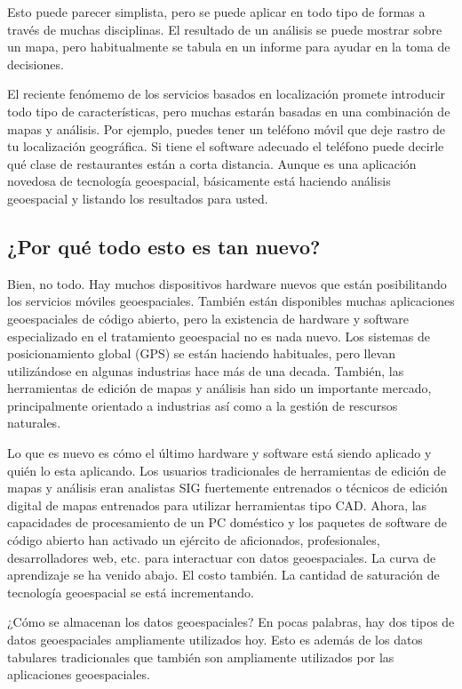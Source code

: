 Esto puede parecer simplista, pero se puede aplicar en todo tipo de
formas a través de muchas disciplinas. El resultado de un análisis se puede 
mostrar sobre un mapa, pero habitualmente se tabula en un informe para ayudar 
en la toma de decisiones.

El reciente fenómemo de los servicios basados en localización promete 
introducir todo tipo de características, pero muchas estarán basadas en una
combinación de mapas y análisis. Por ejemplo, puedes tener un teléfono móvil
que deje rastro de tu localización geográfica. Si tiene el software adecuado
el teléfono puede decirle qué clase de restaurantes están a corta distancia. 
Aunque es una aplicación novedosa de tecnología geoespacial, básicamente 
está haciendo análisis geoespacial y listando los resultados para usted.

\subsection{¿Por qué todo esto es tan nuevo?}\label{label_whynew}

Bien, no todo. Hay muchos dispositivos hardware nuevos que están posibilitando
los servicios móviles geoespaciales. También están disponibles muchas 
aplicaciones geoespaciales de código abierto, pero la existencia de hardware y 
software especializado en el tratamiento geoespacial no es nada nuevo.
Los sistemas de posicionamiento global (GPS) se están haciendo habituales, pero llevan
utilizándose en algunas industrias hace más de una decada. También, las herramientas
de edición de mapas y análisis han sido un importante mercado, principalmente 
orientado a industrias así como a la gestión de rescursos naturales.

Lo que es nuevo es cómo el último hardware y software está siendo aplicado
y quién lo esta aplicando. Los usuarios tradicionales de herramientas de 
edición de mapas y análisis eran analistas SIG fuertemente entrenados o 
técnicos de edición digital de mapas entrenados para utilizar herramientas tipo CAD. 
Ahora, las capacidades de procesamiento de un PC doméstico y los paquetes de software 
de código abierto han activado un ejército de aficionados, profesionales,
desarrolladores web, etc. para interactuar con datos geoespaciales. La curva 
de aprendizaje se ha venido abajo. El costo también. La cantidad de saturación 
de tecnología geoespacial se está incrementando.

¿Cómo se almacenan los datos geoespaciales? En pocas palabras, hay dos tipos
de datos geoespaciales ampliamente utilizados hoy. Esto es además de los datos 
tabulares tradicionales que también son ampliamente utilizados por las
aplicaciones geoespaciales.

